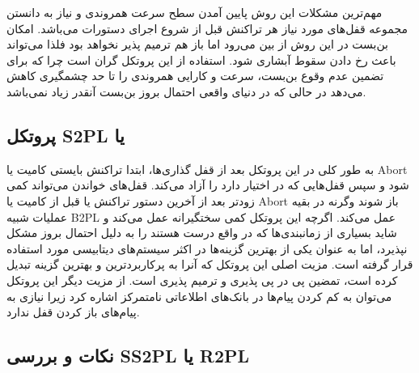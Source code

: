 مهم‌ترین مشکلات این روش پایین آمدن سطح سرعت همروندی و نیاز به دانستن مجموعه
قفل‌های مورد نیاز هر تراکنش قبل از شروع اجرای دستورات می‌باشد. امکان بن‌بست در
این روش از بین می‌رود اما باز هم ترمیم پذیر نخواهد بود فلذا می‌تواند باعث رخ
دادن سقوط آبشاری شود. استفاده از این پروتکل گران است چرا که برای تضمین عدم وقوع
بن‌بست، سرعت و کارایی همروندی را تا حد چشمگیری کاهش می‌دهد در حالی که در دنیای
واقعی احتمال بروز بن‌بست آنقدر زیاد نمی‌باشد.

\subsection{پروتکل S2PL یا }

به طور کلی در این پروتکل بعد از قفل گذاری‌ها، ابتدا تراکنش بایستی کامیت یا Abort
شود و سپس قفل‌هایی که در اختیار دارد را آزاد می‌کند. قفل‌های خواندن می‌تواند کمی
زودتر بعد از آخرین دستور تراکنش یا قبل از کامیت یا Abort باز شوند وگرنه در بقیه
عملیات شبیه B2PL عمل می‌کند. اگرچه این پروتکل کمی سختگیرانه عمل می‌کند و شاید
بسیاری از زمانبندی‌ها که در واقع درست هستند را به دلیل احتمال بروز مشکل نپذیرد،
اما به عنوان یکی از بهترین گزینه‌ها در اکثر سیستم‌های دیتابیسی مورد استفاده قرار
گرفته است. مزیت اصلی این پروتکل که آنرا به پرکاربردترین و بهترین گزینه تبدیل
کرده است، تمضین پی در پی پذیری و ترمیم پذیری است. از مزیت دیگر این پروتکل
می‌توان به کم کردن پیام‌ها در بانک‌های اطلاعاتی نامتمرکز اشاره کرد زیرا نیازی به
پیام‌های باز کردن قفل ندارد.

\begin{LTR}
    \begin{table}[h]
        \begin{RTL}
            \caption{زمانبندی $S_{8}$}
        \end{RTL}
        \centering
    \end{table}
\end{LTR}

\subsection*{نکات و بررسی SS2PL یا R2PL}

